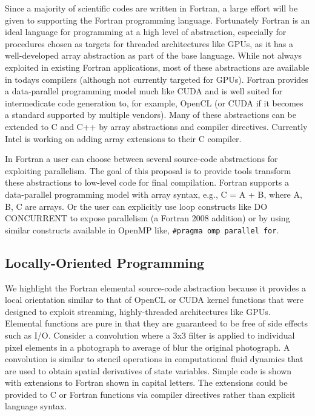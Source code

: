 Since a majority of scientific codes are written in Fortran, a large effort will
be given to supporting the Fortran programming language.  Fortunately Fortran is
an ideal language for programming at a high level of abstraction, especially for
procedures chosen as targets for threaded architectures like GPUs, as it has a
well-developed array abstraction as part of the base language.  While not always
exploited in existing Fortran applications, most of these abstractions are
available in todays compilers (although not currently targeted for GPUs).
Fortran provides a data-parallel programming model much like CUDA and is well
suited for intermedicate code generation to, for example, OpenCL (or CUDA if it
becomes a standard supported by multiple vendors).  Many of these abstractions
can be extended to C and C++ by array abstractions and compiler directives.
Currently Intel is working on adding array extensions to their C compiler.

In Fortran a user can choose between several source-code abstractions for
exploiting parallelism.  The goal of this proposal is to provide tools transform
these abstractions to low-level code for final compilation.  Fortran supports a
data-parallel programming model with array syntax, e.g., C = A + B, where A, B,
C are arrays.  Or the user can explicitly use loop constructs like DO CONCURRENT
to expose parallelism (a Fortran 2008 addition) or by using similar constructs
available in OpenMP like, {\tt \#pragma omp parallel for}.

\subsection{Locally-Oriented Programming}

We highlight the Fortran elemental source-code abstraction because it provides a
local orientation similar to that of OpenCL or CUDA kernel functions that were
designed to exploit streaming, highly-threaded architectures like GPUs.
Elemental functions are pure in that they are guaranteed to be free of side
effects such as I/O.  Consider a convolution where a 3x3 filter is applied to
individual pixel elements in a photograph to average of blur the original photograph.
A convolution is similar to stencil operations in computational fluid dynamics that
are used to obtain spatial derivatives of state variables.  Simple code is shown
with extensions to Fortran shown in capital letters.  The extensions could be
provided to C or Fortran functions via compiler directives rather than explicit 
language syntax.

